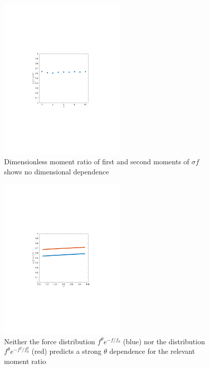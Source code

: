 \begin{figure}[h!]
  \includegraphics[width=230px, trim=133 242 168 254, clip]{excessContactsScaling/mfr.pdf}
     \caption{Dimensionless moment ratio of first and second moments of $\sigma f$ shows no dimensional dependence}
     \label{plot:mfr}
\end{figure}
\begin{figure}[h!]
    \includegraphics[width=230px, trim=143 240 163 250, clip]{excessContactsScaling/theoryMFR.pdf}
    \caption{Neither the force distribution $f^\theta e^{-f/f_0}$  (blue) nor the distribution $f^\theta e^{-f^2/f_0^2}$  (red) predicts a strong $\theta$ dependence for the relevant moment ratio}
    \label{plot:theory_mfr}
\end{figure}




